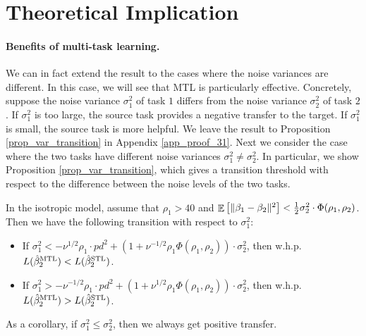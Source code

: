 \section{Theoretical Implication}


\paragraph{Benefits of multi-task learning.}
We can in fact extend the result to the cases where the noise variances are different.
In this case, we will see that MTL is particularly effective.
Concretely, suppose the noise variance $\sigma_1^2$ of task $1$ differs from the noise variance $\sigma_2^2$ of task $2$.
If $\sigma_1^2$ is too large, the source task provides a negative transfer to the target.
If $\sigma_1^2$ is small, the source task is more helpful.
We leave the result to Proposition \ref{prop_var_transition} in Appendix \ref{app_proof_31}.
Next we consider the case where the two tasks have different noise variances $\sigma_1^2\ne \sigma_2^2$. In particular, we show Proposition \ref{prop_var_transition}, which gives a transition threshold with respect to the difference between the noise levels of the two tasks.

\begin{proposition}
\label{prop_var_transition}
	In the isotropic model, assume that $\rho_1 > 40$ and $\mathop{\mathbb{E}}\left[ \|\beta_1 - \beta_2\|^2 \right]< \frac{1}{2} {\sigma_2^2}  \cdot \Phi(\rho_1, \rho_2)$.
	Then we have the following transition with respect to $\sigma_1^2$:
	\begin{itemize}
		\item If $\sigma_1^2 < - \nu^{1/2} \rho_1 \cdot p d^2+\left(1+ \nu^{-1/2}\rho_1 \Phi(\rho_1, \rho_2)\right)\cdot\sigma_2^2$, then w.h.p. $L(\hat{\beta}_2^{\textup{MTL}}) < L(\hat{\beta}_2^{\textup{STL}})$.
		\item If $\sigma_1^2 > -\nu^{-1/2}\rho_1\cdot p d^2   +\left(1+ \nu^{1/2}\rho_1\Phi(\rho_1, \rho_2)\right) \cdot \sigma_2^2$, then w.h.p. $L(\hat{\beta}_2^{\textup{MTL}}) > L(\hat{\beta}_2^{\textup{STL}})$.
	\end{itemize}
\end{proposition}
As a corollary, if $\sigma_1^2 \le \sigma_2^2$, then we always get positive transfer.






